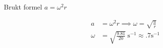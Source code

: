 \subsubsection{}

Brukt formel $a = \omega^2 r$

\begin{align}
a &= \omega^2 r \implies \omega = \sqrt{\frac{a}{r}} \\[2mm]
\omega &= \sqrt{\frac{9.81}{20}} \ \mathrm{s^{-1}} \approx .7 \mathrm{s^{-1}}
\end{align}

\newpage
